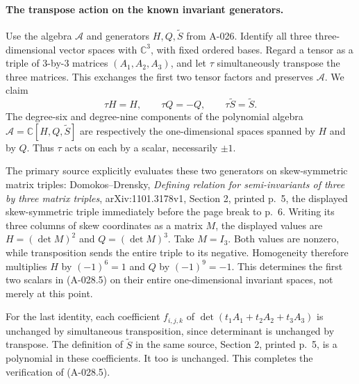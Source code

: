 \paragraph{The transpose action on the known invariant generators.}
Use the algebra \(\mathcal A\) and generators \(H,Q,\widetilde S\)
from A-026. Identify all three three-dimensional vector spaces with
\(\mathbb C^3\), with fixed ordered bases. Regard a tensor as a
triple of \(3\)-by-\(3\) matrices \((A_1,A_2,A_3)\), and let
\(\tau\) simultaneously transpose the three matrices. This exchanges
the first two tensor factors and preserves \(\mathcal A\).
We claim
\[
              \tau H=H,\qquad\tau Q=-Q,\qquad
                     \tau\widetilde S=\widetilde S.             \tag{A-028.5}
\]
The degree-six and degree-nine components of the polynomial algebra
\(\mathcal A=\mathbb C[H,Q,\widetilde S]\) are respectively the
one-dimensional spaces spanned by \(H\) and by \(Q\). Thus \(\tau\)
acts on each by a scalar, necessarily \(\pm1\).

The primary source explicitly evaluates these two generators on
skew-symmetric matrix triples: Domokos--Drensky,
\emph{Defining relation for semi-invariants of three by three matrix
triples}, arXiv:1101.3178v1, Section 2, printed p.~5, the displayed
skew-symmetric triple immediately before the page break to p.~6.
Writing its three columns of skew coordinates as a matrix \(M\),
the displayed values are \(H=(\det M)^2\) and \(Q=(\det M)^3\).
Take \(M=I_3\). Both values are nonzero, while transposition sends
the entire triple to its negative. Homogeneity therefore multiplies
\(H\) by \((-1)^6=1\) and \(Q\) by \((-1)^9=-1\).
This determines the first two scalars in (A-028.5) on their entire
one-dimensional invariant spaces, not merely at this point.

For the last identity, each coefficient \(f_{i,j,k}\) of
\(\det(t_1A_1+t_2A_2+t_3A_3)\) is unchanged by simultaneous
transposition, since determinant is unchanged by transpose.
The definition of \(\widetilde S\) in the same source, Section 2,
printed p.~5, is a polynomial in these coefficients. It too is
unchanged. This completes the verification of (A-028.5).

